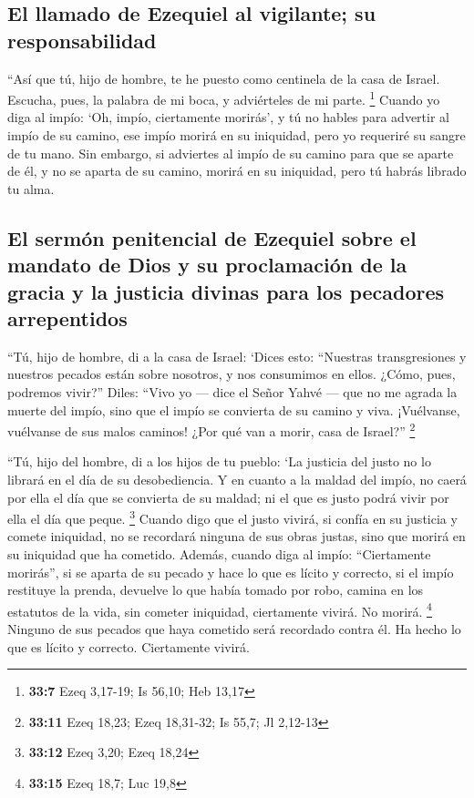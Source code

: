 \begin{paracol}{2}
\hypertarget{el-llamado-de-ezequiel-al-vigilante-su-responsabilidad}{%
\subsection{El llamado de Ezequiel al vigilante; su
responsabilidad}\label{el-llamado-de-ezequiel-al-vigilante-su-responsabilidad}}

 ``Así que tú, hijo de hombre, te he puesto como centinela
de la casa de Israel. Escucha, pues, la palabra de mi boca, y
adviérteles de mi parte. \footnote{\textbf{33:7} Ezeq 3,17-19; Is 56,10;
  Heb 13,17}  Cuando yo diga al impío: `Oh, impío,
ciertamente morirás', y tú no hables para advertir al impío de su
camino, ese impío morirá en su iniquidad, pero yo requeriré su sangre de
tu mano.  Sin embargo, si adviertes al impío de su camino
para que se aparte de él, y no se aparta de su camino, morirá en su
iniquidad, pero tú habrás librado tu alma.

\hypertarget{el-sermuxf3n-penitencial-de-ezequiel-sobre-el-mandato-de-dios-y-su-proclamaciuxf3n-de-la-gracia-y-la-justicia-divinas-para-los-pecadores-arrepentidos}{%
\subsection{El sermón penitencial de Ezequiel sobre el mandato de Dios y
su proclamación de la gracia y la justicia divinas para los pecadores
arrepentidos}\label{el-sermuxf3n-penitencial-de-ezequiel-sobre-el-mandato-de-dios-y-su-proclamaciuxf3n-de-la-gracia-y-la-justicia-divinas-para-los-pecadores-arrepentidos}}

 ``Tú, hijo de hombre, di a la casa de Israel: `Dices
esto: ``Nuestras transgresiones y nuestros pecados están sobre nosotros,
y nos consumimos en ellos. ¿Cómo, pues, podremos vivir?''
 Diles: ``Vivo yo --- dice el Señor Yahvé --- que no me
agrada la muerte del impío, sino que el impío se convierta de su camino
y viva. ¡Vuélvanse, vuélvanse de sus malos caminos! ¿Por qué van a
morir, casa de Israel?'' \footnote{\textbf{33:11} Ezeq 18,23; Ezeq
  18,31-32; Is 55,7; Jl 2,12-13}

 ``Tú, hijo del hombre, di a los hijos de tu pueblo: `La
justicia del justo no lo librará en el día de su desobediencia. Y en
cuanto a la maldad del impío, no caerá por ella el día que se convierta
de su maldad; ni el que es justo podrá vivir por ella el día que peque.
\footnote{\textbf{33:12} Ezeq 3,20; Ezeq 18,24}  Cuando
digo que el justo vivirá, si confía en su justicia y comete iniquidad,
no se recordará ninguna de sus obras justas, sino que morirá en su
iniquidad que ha cometido.  Además, cuando diga al impío:
``Ciertamente morirás'', si se aparta de su pecado y hace lo que es
lícito y correcto,  si el impío restituye la prenda,
devuelve lo que había tomado por robo, camina en los estatutos de la
vida, sin cometer iniquidad, ciertamente vivirá. No morirá. \footnote{\textbf{33:15}
  Ezeq 18,7; Luc 19,8}  Ninguno de sus pecados que haya
cometido será recordado contra él. Ha hecho lo que es lícito y correcto.
Ciertamente vivirá.


\end{paracol}
